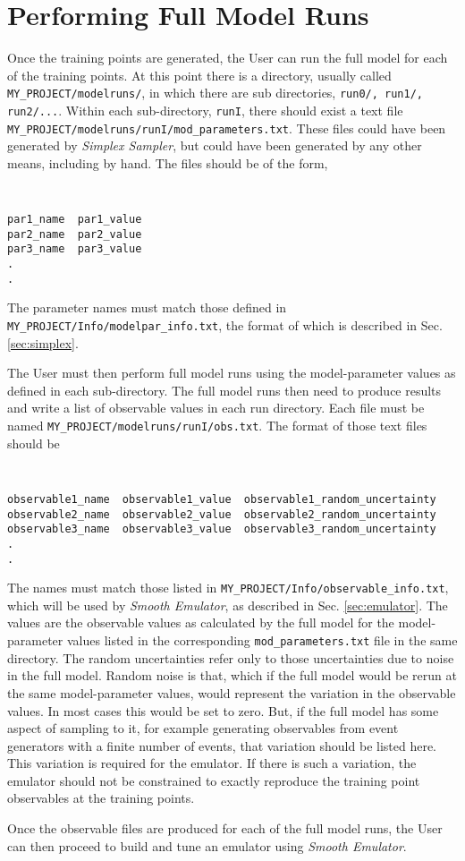 \documentclass[UserManual.tex]{subfiles}
\begin{document}
\setcounter{section}{3}
\section{Performing Full Model Runs}\label{sec:fullmodel}

Once the training points are generated, the User can run the full model for each of the training points. At this point there is a directory, usually called {\tt MY\_PROJECT/modelruns/}, in which there are sub directories, {\tt run0/, run1/, run2/...}.  Within each sub-directory, {\tt runI}, there should exist a text file {\tt MY\_PROJECT/modelruns/runI/mod\_parameters.txt}. These files could have been generated by {\it Simplex Sampler}, but could have been generated by any other means, including by hand. The files should be of the form,
{\tt
\begin{verbatim}
par1_name  par1_value
par2_name  par2_value
par3_name  par3_value
.
.
\end{verbatim}
}
The parameter names must match those defined in {\tt MY\_PROJECT/Info/modelpar\_info.txt}, the format of which is described in Sec. \ref{sec:simplex}. 

The User must then perform full model runs using the model-parameter values as defined in each sub-directory. The full model runs then need to produce results and write a list of observable values in each run directory. Each file must be named {\tt MY\_PROJECT/modelruns/runI/obs.txt}. The format of those text files should be
{\tt
\begin{verbatim}
observable1_name  observable1_value  observable1_random_uncertainty
observable2_name  observable2_value  observable2_random_uncertainty
observable3_name  observable3_value  observable3_random_uncertainty
.
.
\end{verbatim}
}
The names must match those listed in {\tt MY\_PROJECT/Info/observable\_info.txt}, which will be used by {\it Smooth Emulator}, as described in Sec. \ref{sec:emulator}. The values are the observable values as calculated by the full model for the model-parameter values listed in the corresponding {\tt mod\_parameters.txt} file in the same directory. The random uncertainties refer only to those uncertainties due to noise in the full model. Random noise is that, which if the full model would be rerun at the same model-parameter values, would represent the variation in the observable values. In most cases this would be set to zero. But, if the full model has some aspect of sampling to it, for example generating observables from event generators with a finite number of events, that variation should be listed here. This variation is required for the emulator. If there is such a variation, the emulator should not be constrained to exactly reproduce the training point observables at the training points. 

Once the observable files are produced for each of the full model runs, the User can then proceed to build and tune an emulator using {\it Smooth Emulator}.
\end{document}
